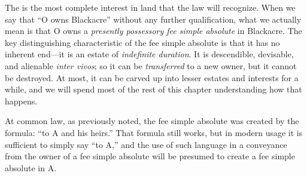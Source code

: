 The  is the most complete interest in land that the
law will recognize. When we say that ``O owns Blackacre'' without any further
qualification, what we actually mean is that O owns a \textit{presently
possessory fee simple absolute }in Blackacre. The key distinguishing
characteristic of the fee simple absolute is that it has no inherent end---it
is an estate of \textit{indefinite duration}. It is descendible, devisable, and
alienable \textit{inter vivos}; so it can be \textit{transferred} to a new
owner, but it cannot be destroyed. At most, it can be carved up into lesser
estates and interests for a while, and we will spend most of the rest of this
chapter understanding how that happens.

At common law, as previously noted, the fee simple absolute was created by the
formula: ``to A and his heirs.'' That formula still works, but in modern usage
it is sufficient to simply say ``to A,'' and the use of such language in a
conveyance from the owner of a fee simple absolute will be presumed to create a
fee simple absolute in A.

